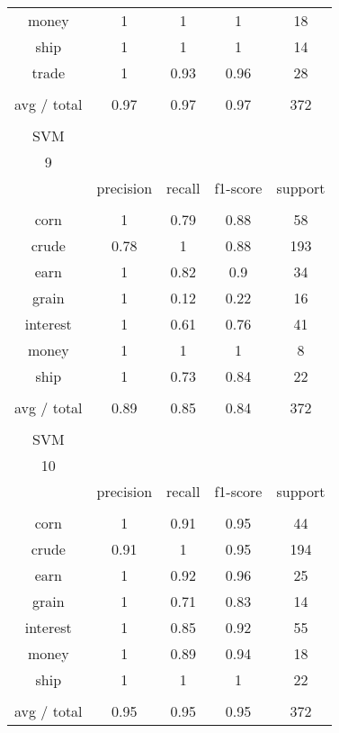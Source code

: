 \documentclass[11pt]{article}
\begin{document}
\begin{center}
\begin{longtable}{| c | c | c | c | c |}
money       & 1         & 1      & 1        & 18      \\
ship        & 1         & 1      & 1        & 14      \\
trade       & 1         & 0.93   & 0.96     & 28      \\
           &           &        &          &         \\
avg / total & 0.97      & 0.97   & 0.97     & 372     \\
           &           &        &          &         \\
SVM         &           &        &          &         \\
9           &           &        &          &         \\
           & precision & recall & f1-score & support \\
           &           &        &          &         \\
corn        & 1         & 0.79   & 0.88     & 58      \\
crude       & 0.78      & 1      & 0.88     & 193     \\
earn        & 1         & 0.82   & 0.9      & 34      \\
grain       & 1         & 0.12   & 0.22     & 16      \\
interest    & 1         & 0.61   & 0.76     & 41      \\
money       & 1         & 1      & 1        & 8       \\
ship        & 1         & 0.73   & 0.84     & 22      \\
           &           &        &          &         \\
avg / total & 0.89      & 0.85   & 0.84     & 372     \\
           &           &        &          &         \\
SVM         &           &        &          &         \\
10          &           &        &          &         \\
           & precision & recall & f1-score & support \\
           &           &        &          &         \\
corn        & 1         & 0.91   & 0.95     & 44      \\
crude       & 0.91      & 1      & 0.95     & 194     \\
earn        & 1         & 0.92   & 0.96     & 25      \\
grain       & 1         & 0.71   & 0.83     & 14      \\
interest    & 1         & 0.85   & 0.92     & 55      \\
money       & 1         & 0.89   & 0.94     & 18      \\
ship        & 1         & 1      & 1        & 22      \\
           &           &        &          &         \\
avg / total & 0.95      & 0.95   & 0.95     & 372   
\end{longtable}
\end{center}
\end{document}
